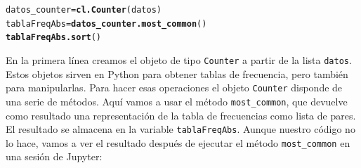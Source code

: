 \documentclass[10pt,a4paper]{article}\usepackage[]{graphicx}\usepackage[]{color}
\makeatletter
\newcommand{\hlstd}[1]{\textcolor[rgb]{0.345,0.345,0.345}{#1}}%
\newcommand{\hlkwb}[1]{\textcolor[rgb]{0.69,0.353,0.396}{#1}}%
\newcommand{\hlkwd}[1]{\textcolor[rgb]{0.737,0.353,0.396}{\textbf{#1}}}%
\newenvironment{kframe}{%
 \def\at@end@of@kframe{}%
 \ifinner\ifhmode%
  \def\at@end@of@kframe{\end{minipage}}%
  \begin{minipage}{\columnwidth}%
 \fi\fi%
 \def\FrameCommand##1{\hskip\@totalleftmargin \hskip-\fboxsep
 \colorbox{shadecolor}{##1}\hskip-\fboxsep
     \hskip-\linewidth \hskip-\@totalleftmargin \hskip\columnwidth}%
 \MakeFramed {\advance\hsize-\width
   \@totalleftmargin\z@ \linewidth\hsize
   \@setminipage}}%
 {\par\unskip\endMakeFramed%
 \at@end@of@kframe}
\newenvironment{knitrout}{}{} %
\makeatother
\begin{document}
\begin{knitrout}
\color{fgcolor}\begin{kframe}
\begin{alltt}
\hlstd{datos_counter} \hlkwb{=} \hlkwd{cl.Counter}\hlstd{(datos)}
\hlstd{tablaFreqAbs} \hlkwb{=} \hlkwd{datos_counter.most_common}\hlstd{()}
\hlkwd{tablaFreqAbs.sort}\hlstd{()}
\end{alltt}
\end{kframe}
\end{knitrout}

En la primera línea creamos el objeto de tipo {\tt Counter} a partir de la lista {\tt datos}. Estos objetos sirven en Python para obtener tablas de frecuencia, pero también para manipularlas. Para hacer esas operaciones el objeto {\tt Counter} disponde de una serie de métodos. Aquí vamos a usar el método \verb&most_common&, que devuelve como resultado una representación de la tabla de frecuencias como lista de pares. El resultado se almacena en la variable {\tt tablaFreqAbs}. Aunque nuestro código no lo hace, vamos a ver el resultado  después de ejecutar el método \verb&most_common& en una sesión de Jupyter:
\end{document}
